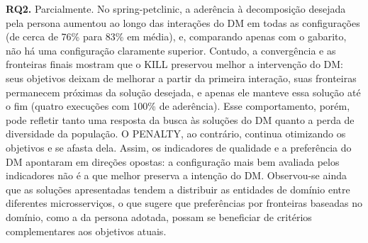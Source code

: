 \documentclass[conference]{IEEEtran}
\begin{document}
\textbf{RQ2.} Parcialmente. No spring-petclinic, a aderência à decomposição desejada pela persona aumentou ao longo das interações do DM em todas as configurações (de cerca de 76\% para 83\% em média), e, comparando apenas com o gabarito, não há uma configuração claramente superior. Contudo, a convergência e as fronteiras finais mostram que o KILL preservou melhor a intervenção do DM: seus objetivos deixam de melhorar a partir da primeira interação, suas fronteiras permanecem próximas da solução desejada, e apenas ele manteve essa solução até o fim (quatro execuções com 100\% de aderência). Esse comportamento, porém, pode refletir tanto uma resposta da busca às soluções do DM quanto a perda de diversidade da população. O PENALTY, ao contrário, continua otimizando os objetivos e se afasta dela. Assim, os indicadores de qualidade e a preferência do DM apontaram em direções opostas: a configuração mais bem avaliada pelos indicadores não é a que melhor preserva a intenção do DM. Observou-se ainda que as soluções apresentadas tendem a distribuir as entidades de domínio entre diferentes microsserviços, o que sugere que preferências por fronteiras baseadas no domínio, como a da persona adotada, possam se beneficiar de critérios complementares aos objetivos atuais.
\end{document}
